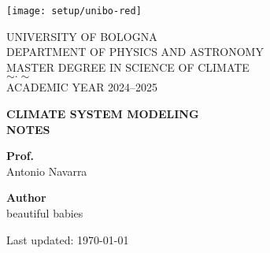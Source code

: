 \pagestyle{empty}


\titleformat{\section}[block]{\centering\bfseries\Large}{}{0pt}{}


\begin{titlepage}

	\setlength{\parindent}{0pt}

	\begin{center}
		\texttt{[image: setup/unibo-red]} %
	\end{center}

	\begin{center}
		\Large UNIVERSITY OF BOLOGNA \\[0.5em]
		\large DEPARTMENT OF PHYSICS AND ASTRONOMY \\[0.5em]
		\large MASTER DEGREE IN SCIENCE OF CLIMATE \\[1em]
		$\sim \cdot \sim$ \\[1em]
		\large ACADEMIC YEAR 2024--2025
	\end{center}

	\vfill

	\begin{center}
		{\LARGE \textbf{CLIMATE SYSTEM MODELING}} \\[0.5em]
		{\LARGE \textbf{NOTES}}
	\end{center}

	\vfill

	\noindent
	\begin{minipage}[t]{0.48\textwidth}
		\raggedright
		\textbf{Prof.} \\
		Antonio Navarra
	\end{minipage}%
	\hfill
	\begin{minipage}[t]{0.48\textwidth}
		\raggedleft
		\textbf{Author} \\
		beautiful babies \\

	\end{minipage}


	\vfill

	\begin{center}
		Last updated:
		\today 
	\end{center}

	\restoregeometry

\end{titlepage}


\titleformat{\section}[block]{\normalfont\Large\bfseries}{\thesection}{1em}{}
